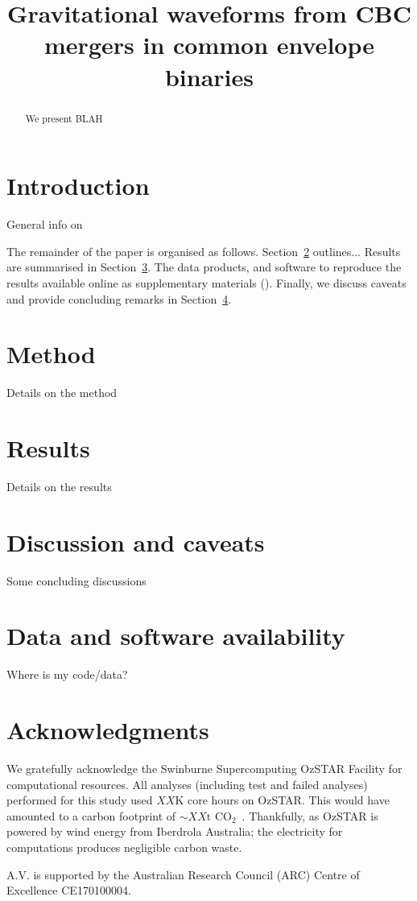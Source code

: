 \documentclass[floatfix,ApJL,twocolumn]{aastex631}
\begin{document}
\title{Gravitational waveforms from CBC mergers in common envelope binaries}







\begin{abstract}
We present BLAH
\end{abstract}




\section{Introduction} \label{sec:intro}

General  info on

The remainder of the paper is organised as follows.
Section~\ref{sec:method} outlines...
Results are summarised in Section~\ref{sec:results}.
The data products, and software to reproduce the results available online as supplementary materials (\projectUrl).
Finally, we discuss caveats and provide concluding remarks in Section~\ref{sec:conclusion}.

\section{Method} \label{sec:method}
Details on the method

\section{Results}\label{sec:results}
Details on the results

\section{Discussion and caveats}\label{sec:conclusion}
Some concluding discussions

\section{Data and software availability}\label{sec:data}
Where is my code/data?






\section*{Acknowledgments}{


We gratefully acknowledge the Swinburne Supercomputing OzSTAR Facility for computational resources. All analyses (including test and failed analyses) performed for this study used $XX$K core hours on OzSTAR. This would have amounted to a carbon footprint of ${\sim XX{\text{t CO}_2}}$~\citep{greenhouse, energy_to_co2_converter}. Thankfully, as OzSTAR is powered by wind energy from Iberdrola Australia; the electricity for computations produces negligible carbon waste.


A.V. is supported by the Australian Research Council (ARC) Centre of Excellence CE170100004.

}
\end{document}
